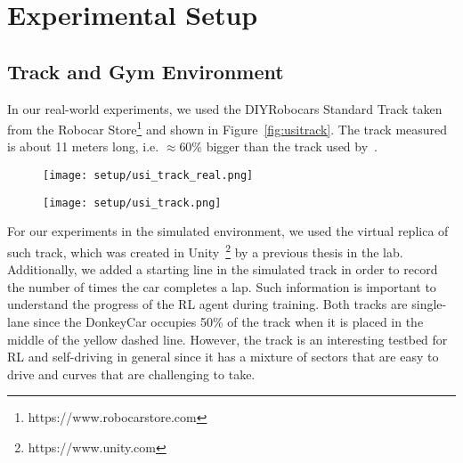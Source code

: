 \chapter{Experimental Setup}


\section{Track and Gym Environment} \label{sec:track}
In our real-world experiments, we used the DIYRobocars Standard Track taken from the Robocar Store\footnote{https://www.robocarstore.com} and shown in Figure~\ref{fig:usitrack}. The track measured is about 11 meters long, i.e. $\approx$60\% bigger than the track used by~\citet{DBLP:journals/corr/abs-2008-00715}. 

\begin{figure}[h]
    \centering
\begin{minipage}{.5\textwidth}
    \centering
    \texttt{[image: setup/usi\_track\_real.png]}
    \label{fig:usitrack}
\end{minipage}%
\begin{minipage}{.5\textwidth}
    \centering
    \texttt{[image: setup/usi\_track.png]}
    \label{fig:usitracksim}
\end{minipage}
\end{figure}

For our experiments in the simulated environment, we used the virtual replica of such track, which was created in Unity~\footnote{https://www.unity.com} by a previous thesis in the lab. Additionally, we added a starting line in the simulated track in order to record the number of times the car completes a lap. Such information is important to understand the progress of the RL agent during training. Both tracks are single-lane since the DonkeyCar occupies 50\% of the track when it is placed in the middle of the yellow dashed line. However, the track is an interesting testbed for RL and self-driving in general since it has a mixture of sectors that are easy to drive and curves that are challenging to take.

